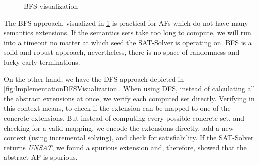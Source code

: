 \begin{figure}[h!]
    \centering
    \caption{BFS visualization}
    \label{fig:ImplementationBFSVisualization}
\end{figure}



The BFS approach, visualized in \cref{fig:ImplementationBFSVisualization} is practical for AFs which do not have many semantics extensions. If the semantics sets take too long to compute, we will run into a timeout no matter at which seed the SAT-Solver is operating on. BFS is a solid and robust approach, nevertheless, there is no space of randomness and lucky early terminations.

On the other hand, we have the DFS approach depicted in \cref{fig:ImplementationDFSVisualization}. When using DFS, instead of calculating all the abstract extensions at once, we verify each computed set directly. Verifying in this context means, to check if the extension can be mapped to one of the concrete extensions. But instead of computing every possible concrete set, and checking for a valid mapping, we encode the extensions directly, add a new context (using incremental solving), and check for satisfiability. If the SAT-Solver returns \emph{UNSAT}, we found a spurious extension and, therefore, showed that the abstract AF is spurious.


